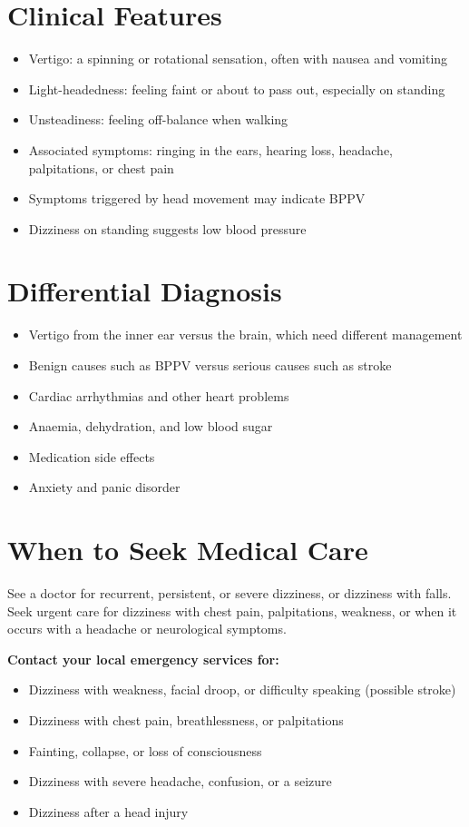 \section*{Clinical Features}
\begin{itemize}
    \item Vertigo: a spinning or rotational sensation, often with nausea and vomiting
    \item Light-headedness: feeling faint or about to pass out, especially on standing
    \item Unsteadiness: feeling off-balance when walking
    \item Associated symptoms: ringing in the ears, hearing loss, headache, palpitations, or chest pain
    \item Symptoms triggered by head movement may indicate BPPV
    \item Dizziness on standing suggests low blood pressure
\end{itemize}

\section*{Differential Diagnosis}
\begin{itemize}
    \item Vertigo from the inner ear versus the brain, which need different management
    \item Benign causes such as BPPV versus serious causes such as stroke
    \item Cardiac arrhythmias and other heart problems
    \item Anaemia, dehydration, and low blood sugar
    \item Medication side effects
    \item Anxiety and panic disorder
\end{itemize}

\section*{When to Seek Medical Care}
See a doctor for recurrent, persistent, or severe dizziness, or dizziness with falls. Seek urgent care for dizziness with chest pain, palpitations, weakness, or when it occurs with a headache or neurological symptoms.

\textbf{Contact your local emergency services for:}
\begin{itemize}
    \item Dizziness with weakness, facial droop, or difficulty speaking (possible stroke)
    \item Dizziness with chest pain, breathlessness, or palpitations
    \item Fainting, collapse, or loss of consciousness
    \item Dizziness with severe headache, confusion, or a seizure
    \item Dizziness after a head injury
\end{itemize}

